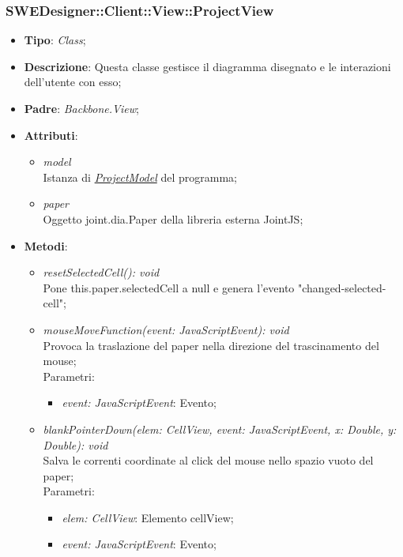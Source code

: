 \documentclass[../DefinizioneDiProdotto.tex]{subfiles}
\begin{document}
				\subsubsection{SWEDesigner::Client::View::ProjectView}
					\hypertarget{SWEDesigner::Client::View::ProjectView}{}
					\begin{itemize}
						\item \textbf{Tipo}: \emph{Class};
						\item \textbf{Descrizione}: Questa classe gestisce il diagramma disegnato e le interazioni dell'utente con esso;
						\item \textbf{Padre}: \emph{Backbone.View};
						\item \textbf{Attributi}:
						\begin{itemize}
							\item \emph{model} \\
							Istanza di \hyperlink{SWEDesigner::Model::ProjectModel}{\emph{ProjectModel}} del programma;
							\item \emph{paper} \\
							Oggetto joint.dia.Paper della libreria esterna JointJS;
						\end{itemize}
						\item \textbf{Metodi}:
						\begin{itemize}
							\item \emph{resetSelectedCell(): void} \\
							Pone this.paper.selectedCell a null e genera l'evento "changed-selected-cell";
							\item \emph{mouseMoveFunction(event: JavaScriptEvent): void} \\
							Provoca la traslazione del paper nella direzione del trascinamento del mouse; \\
							Parametri:
							\begin{itemize}
								\item \emph{event: JavaScriptEvent}: Evento;
							\end{itemize}
							\item \emph{blankPointerDown(elem: CellView, event: JavaScriptEvent, x: Double, y: Double): void} \\
							Salva le correnti coordinate al click del mouse nello spazio vuoto del paper; \\
							Parametri:
							\begin{itemize}
								\item \emph{elem: CellView}: Elemento cellView;
								\item \emph{event: JavaScriptEvent}: Evento;

\end{itemize}
\end{itemize}
\end{itemize}
\end{document}
